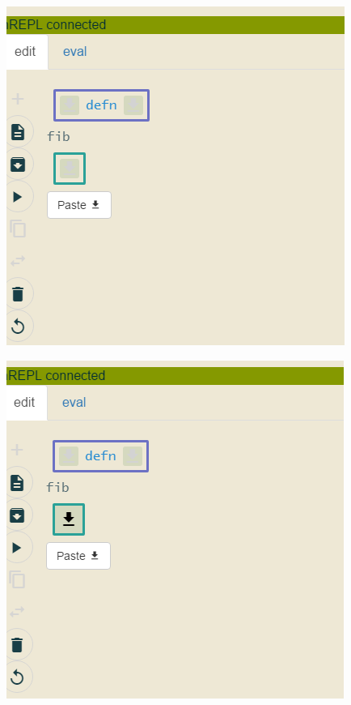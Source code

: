 \documentclass[english,mgr,shortabstract]{iithesis}
\begin{document}
\begin{figure}[hbt]
\begin{minipage}{0.48\textwidth}
\label{fig:j-cut}
  \end{minipage}
\end{figure}

\begin{figure}[hbt]
  \centering
  \begin{minipage}{0.48\textwidth}
    \centering
    \includegraphics[scale=0.3]{img/j-pasting}
\label{fig:j-pasting}
  \end{minipage}
  \begin{minipage}{0.48\textwidth}
    \centering
    \includegraphics[scale=0.3]{img/j-insert-click}
\label{fig:j-i-insert}
  \end{minipage}
\end{figure}
\end{document}
